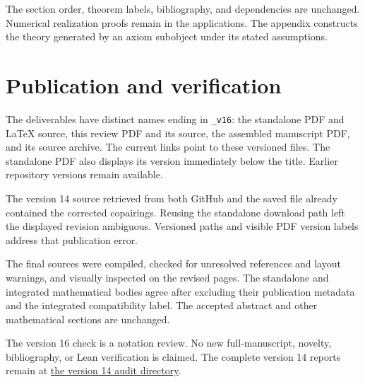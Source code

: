 \documentclass[10pt]{article}
\begin{document}
The section order, theorem labels, bibliography, and dependencies are unchanged.
Numerical realization proofs remain in the applications. The appendix constructs
the theory generated by an axiom subobject under its stated assumptions.

\section*{Publication and verification}
The deliverables have distinct names ending in \texttt{\_v16}: the standalone
PDF and LaTeX source, this review PDF and its source, the assembled manuscript
PDF, and its source archive. The current links point to these versioned files.
The standalone PDF also displays its version immediately below the title.
Earlier repository versions remain available.

The version 14 source retrieved from both GitHub and the saved file already
contained the corrected copairings. Reusing the standalone download path left
the displayed revision ambiguous. Versioned paths and visible PDF version
labels address that publication error.

The final sources were compiled, checked for unresolved references and layout
warnings, and visually inspected on the revised pages. The standalone and
integrated mathematical bodies agree after excluding their publication metadata
and the integrated compatibility label. The accepted abstract and other
mathematical sections are unchanged.

The version 16 check is a notation review. No new full-manuscript, novelty,
bibliography, or Lean verification is claimed. The complete version 14 reports
remain at
\href{https://github.com/flengyel/CategoricalEssentialIncompleteness/tree/main/Audit/2026-10-31-appendix-v14}{the version 14 audit directory}.
\end{document}
